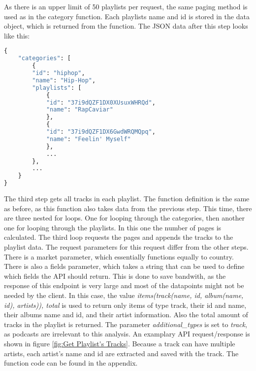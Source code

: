 As there is an upper limit of 50 playlists per request, the same paging method is used as in the category function.
Each playlists name and id is stored in the data object, which is returned from the function.
The JSON data after this step looks like this:

\begin{lstlisting}[language=Python]
{
    "categories": [
        {
        "id": "hiphop",
        "name": "Hip-Hop",
        "playlists": [
            {
            "id": "37i9dQZF1DX0XUsuxWHRQd",
            "name": "RapCaviar"
            },
            {
            "id": "37i9dQZF1DX6GwdWRQMQpq",
            "name": "Feelin' Myself"
            },
            ...
        },
        ...
    }
}
\end{lstlisting}

The third step gets all tracks in each playlist. The function definition is the same as before, as this function also
takes data from the previous step. This time, there are three nested for loops. One for looping through the categories,
then another one for looping through the playlists. In this one the number of pages is calculated.
The third loop requests the pages and appends the tracks to the playlist data.
The request parameters for this request differ from the other steps.
There is a market parameter, which essentially functions equally to country.
There is also a fields parameter, which takes a string that can be used to define which fields the API should
return. This is done to save bandwith, as the response of this endpoint is very large and most
of the datapoints might not be needed by the client.
In this case, the value \emph{items(track(name, id, album(name, id), artists)), total} is used to return only
items of type track, their id and name, their albums name and id, and their artist information.
Also the total amount of tracks in the playlist is returned.
The parameter \emph{additional\_types} is set to \emph{track}, as podcasts are irrelevant to this analysis.
An examplary API request/response is shown in figure \ref{fig:Get Playlist's Tracks}.
Because a track can have multiple artists, each artist's name and id are extracted and saved with the track.
The function code can be found in the appendix.

